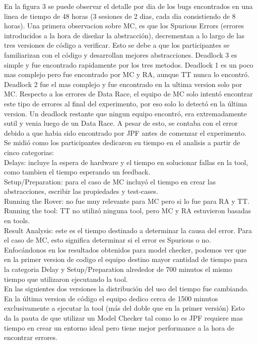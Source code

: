 \documentclass[runningheads]{llncs}
\begin{document}
En la figura 3 se puede observar el detalle por dia de los bugs encontrados en una linea de tiempo de 48 horas (3 sesiones de 2 dias, cada dia consistiendo de 8 horas). Una primera observacion sobre MC, es que los Spurious Errors (errores introducidos a la hora de dise\~nar la abstracci\'on), decrementan a lo largo de las tres versiones de c\'odigo a verificar. Esto se debe a que los participantes se familiarizan con el c\'odigo y desarrollan mejores abstracciones. Deadlock 3 es simple y fue encontrado rapidamente por los tres metodos. Deadlock 1 es un poco mas complejo pero fue encontrado por MC y RA, aunque TT nunca lo encontr\'o. Deadlock 2 fue el mas complejo y fue encontrado en la ultima version solo por MC. Respecto a los errores de Data Race, el equipo de MC solo intentó encontrar este tipo de errores al final del experimento, por eso solo lo detect\'o en la \'ultima version. Un deadlock restante que ningun equipo encontr\'o, era extremadamente sutil y venia luego de un Data Race. A pesar de esto, se contaba con el error debido a que habia sido encontrado por JPF antes de comenzar el experimento.\\
Se midi\'o como los participantes dedicaron su tiempo en el analisis a partir de cinco categorias:\\
Delays: incluye la espera de hardware y el tiempo en solucionar fallas en la tool, como tambien el tiempo esperando un feedback.\\
Setup/Preparation: para el caso de MC incluyó el tiempo en crear las abstracciones, escribir las propiedades y test-cases.\\
Running the Rover: no fue muy relevante para MC pero si lo fue para RA y TT.\\
Running the tool: TT no utilizó ninguna tool, pero MC y RA estuvieron basadas en tools.\\
Result Analysis: este es el tiempo destinado a determinar la causa del error. Para el caso de MC, esto significa determinar si el error es Spurious o no.\\
Enfoc\'andonos en los resultados obtenidos para model checker, podemos ver que en la primer version de codigo el equipo destino mayor cantidad de tiempo para la categoria Delay y Setup/Preparation alrededor de 700 minutos el mismo tiempo que utilizaron ejecutando la tool.\\
En las siguientes dos versiones la distribuci\'on del uso del tiempo fue cambiando. En la \'ultima version de c\'odigo el equipo dedico cerca de 1500 minutos exclusivamente a ejecutar la tool (m\'as del doble que en la primer versi\'on)
Esto da la pauta de que utilizar un Model Checker tal como lo es JPF requiere mas tiempo en crear un entorno ideal pero tiene mejor performance a la hora de encontrar errores.
\end{document}
